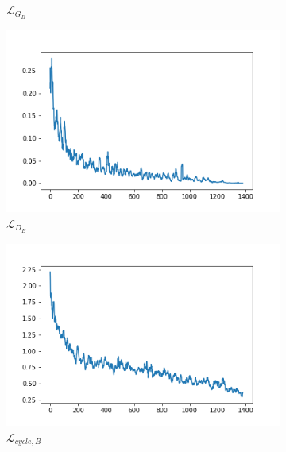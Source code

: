 \documentclass{beamer}
\begin{document}
\begin{frame}
\begin{figure}[htb]
\begin{subfigure}[b]{0.23\linewidth}
            \caption{$\mathcal{L}_{G_B}$}
          \end{subfigure}
          \begin{subfigure}[b]{0.23\linewidth}
            \includegraphics[width=\linewidth]{exp2_D_B.png}
            \caption{$\mathcal{L}_{D_B}$}
          \end{subfigure}
          \begin{subfigure}[b]{0.23\linewidth}
            \includegraphics[width=\linewidth]{exp2_cycle_B.png}
            \caption{$\mathcal{L}_{cycle,B}$}
          \end{subfigure}
          \begin{subfigure}[b]{0.23\linewidth}

\end{subfigure}
\end{figure}
\end{frame}
\end{document}
